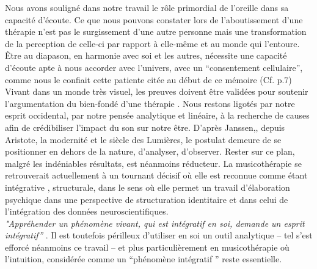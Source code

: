 Nous avons souligné dans notre travail le rôle primordial de
l'oreille dans sa capacité d'écoute. %
Ce que nous pouvons constater lors de l'aboutissement
d'une thérapie n'est pas le surgissement d'une autre personne mais une transformation
de la perception de celle-ci par rapport à elle-même et au monde qui l'entoure.
Être au diapason, en harmonie avec soi et les autres, nécessite une capacité d'écoute apte à nous 
accorder avec l'univers, avec un \enquote {consentement cellulaire}, comme nous le 
confiait cette patiente citée au début de ce mémoire (Cf. p.7)
\\
Vivant dans un monde très visuel, les preuves doivent être
validées pour soutenir l'argumentation du bien-fondé d'une thérapie
\autocite{vrait_musicotherapie_2018}.
Nous restons
  ligotés par notre esprit occidental, par
  notre pensée analytique et linéaire, à la recherche de
  causes afin de crédibiliser l'impact
  du son sur notre être.
  D'après Janssen,\autocite{van_eersel_cerveau}, depuis Aristote, la modernité et le
siècle des Lumières, le postulat demeure de se positionner en dehors
de la nature, d'analyser, d'observer.
Rester sur ce plan, malgré les
indéniables résultats, est néanmoins
réducteur.
La musicothérapie  se retrouverait actuellement
 à un tournant décisif où elle est reconnue comme étant intégrative
 \autocite{vrait_musicotherapie_2018},
struc\-tu\-rale, dans le sens où elle permet un travail d'élaboration psychique dans une perspective de 
structuration identitaire  et dans celui de l'intégration des données neuroscientifiques.
\\
\textit{"Appréhender un phénomène vivant, qui est intégratif en soi, demande un esprit
  intégratif''} \autocite[201]{van_eersel_cerveau}.
Il est toutefois périlleux d'utiliser en soi un outil analytique -- tel s'est efforcé néanmoins ce travail -- et
plus
particulièrement en musicothérapie où l'intuition, 
considérée comme un ``phénomène intégratif '' reste essentielle.

